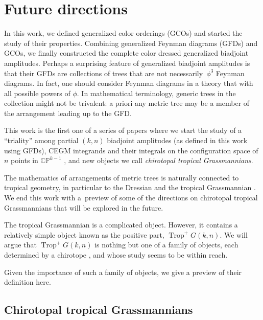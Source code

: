 \documentclass[pdftex]{sigma}
\theoremstyle{definition}
\numberwithin{equation}{section}
\begin{document}
\section{Future directions}\label{sec10}

In this work, we defined generalized color orderings (GCOs) and started the study of their properties. Combining generalized Feynman diagrams (GFDs) and GCOs, we finally constructed the complete color dressed generalized biadjoint amplitudes. Perhaps a surprising feature of generalized biadjoint amplitudes is that their GFDs are collections of trees that are not necessarily~$\phi^3$ Feynman diagrams. In fact, one should consider Feynman diagrams in a theory that with all possible powers of $\phi$. In mathematical terminology, generic trees in the collection might not be trivalent: a priori any metric tree may be a member of the arrangement leading up to the GFD.


This work is the first one of a series of papers where we start the study of a ``triality'' among partial $(k,n)$ biadjoint amplitudes (as defined in this work using GFDs), CEGM integrands and their integrals on the configuration space of $n$ points in $\mathbb{CP}^{k-1}$ \cite{Cachazo:2023ltw}, and new objects we call {\it chirotopal tropical Grassmannians}.


The mathematics of arrangements of metric trees is naturally connected to tropical geometry, in particular to the Dressian and the tropical Grassmannian \cite{herrmann2008draw}.
We end this work with a~preview of some of the directions on chirotopal tropical Grassmannians that will be explored in the future.


The tropical Grassmannian is a complicated object. However, it contains a relatively simple object known as the positive part, $\operatorname{Trop}^+G(k,n)$. We will argue that $\operatorname{Trop}^+G(k,n)$ is nothing but one of a family of objects, each determined by a chirotope \cite{bjorner1999oriented}, and whose study seems to be within reach.

Given the importance of such a family of objects, we give a preview of their definition here.

\subsection{Chirotopal tropical Grassmannians\label{chirotopalsection}}
\end{document}

